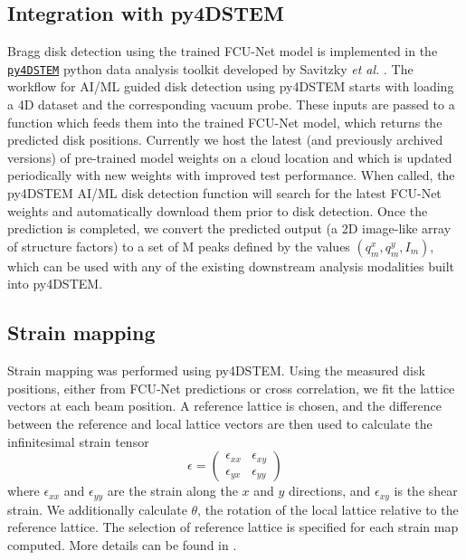 \documentclass[%
 reprint,
superscriptaddress,
 amsmath,
 amssymb,
 prl,
]{revtex4-2}
\newcommand{\pyFDSTEM}{\href{https://github.com/py4dstem/py4DSTEM}{\texttt{py4DSTEM}}}
\begin{document}
\subsection*{Integration with py4DSTEM}

Bragg disk detection using the trained FCU-Net model is implemented in the \pyFDSTEM{} python data analysis toolkit developed by Savitzky \textit{et al.} \cite{savitzky2021py4dstem}. The workflow for AI/ML guided disk detection using py4DSTEM starts with loading a 4D dataset and the corresponding vacuum probe. These inputs are passed to a function which feeds them into the trained FCU-Net model, which returns the predicted disk positions.  Currently we host the latest (and previously archived versions) of pre-trained model weights on a cloud location and which is updated periodically with new weights with improved test performance. When called, the py4DSTEM AI/ML disk detection function will search for the latest FCU-Net weights and automatically download them prior to disk detection. Once the prediction is completed, we convert the predicted output (a 2D image-like array of structure factors) to a set of M peaks defined by the values $(q^x_m, q^y_m, I_m)$, which can be used with any of the existing downstream analysis modalities built into py4DSTEM. 


\subsection*{Strain mapping}

Strain mapping was performed using py4DSTEM.  Using the measured disk positions, either from FCU-Net predictions or cross correlation, we fit the lattice vectors at each beam position.  A reference lattice is chosen, and the difference between the reference and local lattice vectors are then used to calculate the infinitesimal strain tensor
\begin{equation}
    \epsilon = \begin{pmatrix}
               \epsilon_{xx}  &  \epsilon_{xy} \\
               \epsilon_{yx}  &  \epsilon_{yy}
               \end{pmatrix}
\end{equation}
where $\epsilon_{xx}$ and $\epsilon_{yy}$ are the strain along the $x$ and $y$ directions, and $\epsilon_{xy}$ is the shear strain.  We additionally calculate $\theta$, the rotation of the local lattice relative to the reference lattice.  The selection of reference lattice is specified for each strain map computed.  More details can be found in \cite{pekin2017optimizing, savitzky2021py4dstem}.
\end{document}
